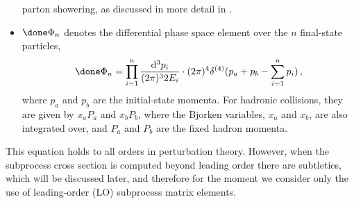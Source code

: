 \begin{itemize}
      parton showering, as discussed in more detail in
      .
\item $\done\Phi_n$ denotes the differential phase space element over the $n$ 
      final-state particles,
      \begin{equation}
      \done\Phi_n = \prod\limits_{i=1}^n\frac{{\rm d}^3p_i}{(2\pi)^32E_i}
      \cdot(2\pi)^4\delta^{(4)}(p_a+p_b-\sum\limits_{i=1}^n p_i)\,,
      \end{equation}
      where $p_a$ and $p_b$ are the initial-state momenta.  For
      hadronic collisions, they are given by $x_aP_a$ and $x_bP_b$,
      where the Bjorken variables, $x_a$ and $x_b$, are also
      integrated over, and $P_a$ and $P_b$ are the fixed hadron
      momenta.
\end{itemize}

This equation holds to all orders in perturbation theory.   However,
when the subprocess cross section is computed beyond leading order
there are subtleties, which will be discussed later, and therefore for
the moment we consider only the use of leading-order (LO) subprocess
matrix elements.

